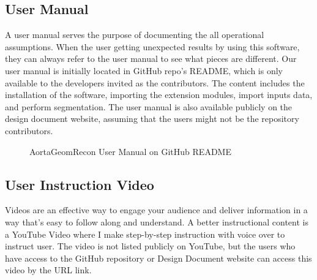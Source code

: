 \subsection{User Manual}
A user manual serves the purpose of documenting the all operational assumptions. When the user getting unexpected results by using this software, they can always refer to the user manual to see what pieces are different. Our user manual is initially located in GitHub repo's README, which is only available to the developers invited as the contributors. The content includes the installation of the software, importing the extension modules, import inputs data, and perform segmentation. The user manual is also available publicly on the design document website, assuming that the users might not be the repository contributors.

\begin{figure}[H]
    \centering
    \caption[AortaGeomRecon User Manual on GitHub README]{AortaGeomRecon User Manual on GitHub README}
    \label{fig_agr_git_um}
\end{figure}


\subsection{User Instruction Video}
Videos are an effective way to engage your audience and deliver information in a way that's easy to follow along and understand. A better instructional content is a YouTube Video where I make step-by-step instruction with voice over to instruct user. The video is not listed publicly on YouTube, but the users who have access to the GitHub repository or Design Document website can access this video by the URL link.

